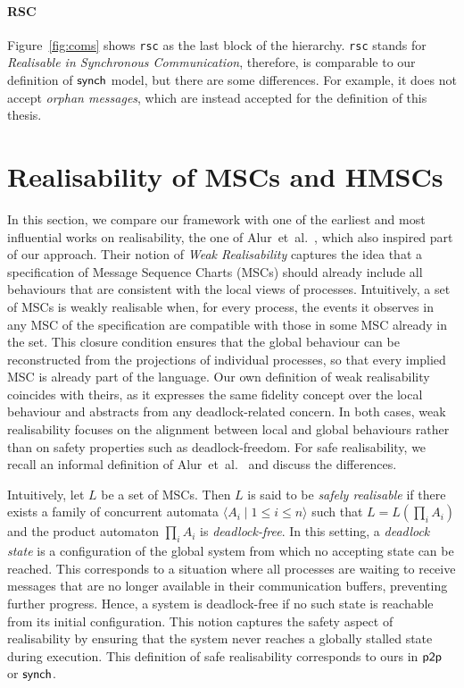 \paragraph{RSC}
Figure~\ref{fig:coms} shows \verb|rsc| as the last block of the hierarchy.
\verb|rsc| stands for \emph{Realisable in Synchronous Communication}, therefore, 
is comparable to our definition of $\mathsf{synch}$ model, but there are 
some differences. For example, it does not accept \emph{orphan messages}, 
which are instead accepted for the definition of this thesis.


\section{Realisability of MSCs and HMSCs}
In this section, we compare our framework with one of the earliest and
most influential works on realisability, the one of 
Alur~et~al.~\cite{alur2005realizability}, which also inspired part of our
approach. Their notion of \emph{Weak Realisability} captures the idea that
a specification of Message Sequence Charts (MSCs) should already include
all behaviours that are consistent with the local views of processes. 
Intuitively, a set of MSCs is weakly realisable when, for every process,
the events it observes in any MSC of the specification are compatible
with those in some MSC already in the set. This closure condition ensures
that the global behaviour can be reconstructed from the projections of
individual processes, so that every implied MSC is already part of the
language. 
Our own definition
of weak realisability coincides with theirs, as it expresses the same
fidelity concept over the local behaviour and abstracts from any
deadlock-related concern. In both cases, weak realisability focuses on
the alignment between local and global behaviours rather than on safety
properties such as deadlock-freedom. For safe realisability, we recall an
informal definition of Alur~et~al.~\cite{alur2005realizability} and discuss
the differences.

Intuitively, let $L$ be a set of MSCs. Then $L$ is said to be 
\emph{safely realisable} if there exists a family of concurrent automata 
$\langle A_i \mid 1 \leq i \leq n \rangle$ such that $L = L(\prod_i A_i)$ 
and the product automaton $\prod_i A_i$ is \emph{deadlock-free}. 
In this setting, a \emph{deadlock state} is a configuration of the global 
system from which no accepting state can be reached. 
This corresponds to a situation where all processes are 
waiting to receive messages that are no longer available in their 
communication buffers, preventing further progress. 
Hence, a system is deadlock-free if no such state is reachable from its 
initial configuration. This notion captures the safety aspect of 
realisability by ensuring that the system never reaches a globally 
stalled state during execution. This definition of safe realisability 
corresponds to ours in $\mathsf{p2p}$ or $\mathsf{synch}$.

